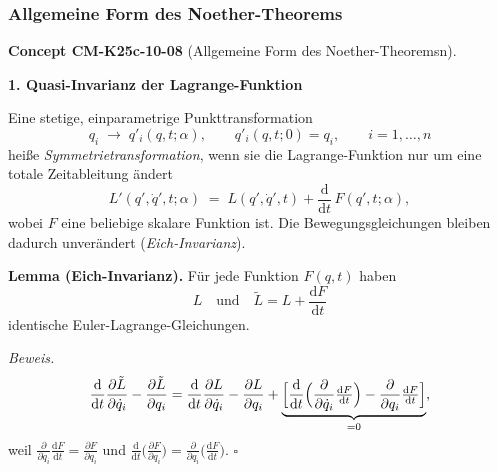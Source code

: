 \documentclass[10pt, letterpaper]{article}
\newcommand{\CustomHeading}[3]{%
  \par\medskip\noindent%
  \textbf{#1 #2} \textnormal{(#3)}.\enskip%
}
\newenvironment{CONC}[2]{\begin{unitbox}\CustomHeading{Concept}{#1}{#2}}{\end{unitbox}}
\begin{document}
\subsubsection{Allgemeine Form des Noether-Theorems}





\begin{CONC}{CM-K25c-10-08}{Allgemeine Form des Noether-Theoremsn}
\textbf{1. Quasi-Invarianz der Lagrange-Funktion}

Eine stetige, einparametrige Punkttransformation
\[
  q_i \;\longrightarrow\; q'_i(q,t;\alpha),
  \qquad
  q'_i(q,t;0)=q_i,
  \qquad i=1,\dots,n
\]
heiße \emph{Symmetrietransformation}, wenn sie die Lagrange-Funktion nur
um eine totale Zeitableitung ändert
\begin{equation}
  L'(q',\dot q',t;\alpha)
  \;=\;
  L(q',\dot q',t)
  +\frac{\mathrm d}{\mathrm dt}\,F(q',t;\alpha) ,
  \label{eq:quasiinv}
\end{equation}
wobei \(F\) eine beliebige skalare Funktion ist.  
Die Bewegungsgleichungen bleiben dadurch unverändert
(\emph{Eich-Invarianz}).  

\textbf{Lemma (Eich-Invarianz).}  
Für jede Funktion \(F(q,t)\) haben
\[
  L \quad\text{und}\quad 
  \tilde L=L+\frac{\mathrm dF}{\mathrm dt}
\]
identische Euler-Lagrange-Gleichungen.

\emph{Beweis.}
\[
  \frac{\mathrm d}{\mathrm dt}\frac{\partial\tilde L}{\partial\dot q_i}
 -\frac{\partial\tilde L}{\partial q_i}
 =
 \frac{\mathrm d}{\mathrm dt}\frac{\partial L}{\partial\dot q_i}
 -\frac{\partial L}{\partial q_i}
 +\underbrace{\Bigl[
   \frac{\mathrm d}{\mathrm dt}
     \Bigl(\frac{\partial}{\partial\dot q_i}\tfrac{\mathrm dF}{\mathrm dt}\Bigr)
  -\frac{\partial}{\partial q_i}\tfrac{\mathrm dF}{\mathrm dt}
 \Bigr]}_{=0},
\]
weil
\(
 \frac{\partial}{\partial\dot q_i}\tfrac{\mathrm dF}{\mathrm dt}
 =\frac{\partial F}{\partial q_i}
\)
und 
\(
 \frac{\mathrm d}{\mathrm dt}\!\bigl(\tfrac{\partial F}{\partial q_i}\bigr)
 =\frac{\partial}{\partial q_i}\!\bigl(\tfrac{\mathrm dF}{\mathrm dt}\bigr).
\)
\hfill\(\square\)


\end{CONC}
\end{document}

